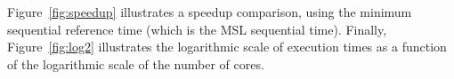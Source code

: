 Figure~\ref{fig:speedup} illustrates a speedup comparison, using the minimum sequential reference time (which is the MSL sequential time). Finally, Figure~\ref{fig:log2} illustrates the logarithmic scale of execution times as a function of the logarithmic scale of the number of cores.
